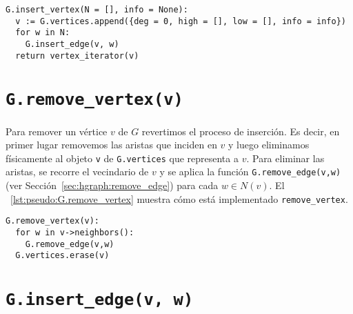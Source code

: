 \documentclass[%
    a4paper,%
    fontsize=12pt,%
    DIV=12,
    twoside,%
    openright,%
    titlepage=true,%
    headsepline,%
    toc=bibliography,%
    parskip=half,%
    cleardoublepage=empty,%
    headings=big,%
]{scrbook}
\makeatletter
\newcommand{\Code}[1]{\lstinline[basicstyle={\ttfamily}]@#1@}
\makeatother
\begin{document}
\begin{lstlisting}[caption={Implementación de \Code{insert_vertex}.},float=ht,label={lst:pseudo:G.insert_vertex}]
G.insert_vertex(N = [], info = None):
  v := G.vertices.append({deg = 0, high = [], low = [], info = info})
  for w in N:
    G.insert_edge(v, w)
  return vertex_iterator(v)
\end{lstlisting}

\section{\texorpdfstring{\Code{G.remove_vertex(v)}}{G.remove\_vertex(v)}}
\label{sec:hgraph:remove_vertex}

Para remover un vértice $v$ de $G$ revertimos el proceso de inserción.  Es decir, en primer lugar removemos las aristas que inciden en $v$ y luego eliminamos físicamente al objeto \Code{v} de \Code{G.vertices} que representa a $v$.  Para eliminar las aristas, se recorre el vecindario de $v$ y se aplica la función \Code{G.remove_edge(v,w)} (ver Sección~\ref{sec:hgraph:remove_edge}) para cada $w \in N(v)$.  El \lstlistingname~\ref{lst:pseudo:G.remove_vertex} muestra cómo está implementado \Code{remove_vertex}.

\begin{lstlisting}[caption={Implementación de \Code{remove_vertex}.},float=ht,label={lst:pseudo:G.remove_vertex}]
G.remove_vertex(v):
  for w in v->neighbors():
    G.remove_edge(v,w)
  G.vertices.erase(v)
\end{lstlisting}



\section{\texorpdfstring{\Code{G.insert_edge(v, w)}}{G.insert\_edge(v, w)}}
\label{sec:hgraph:insert_edge}
\end{document}

